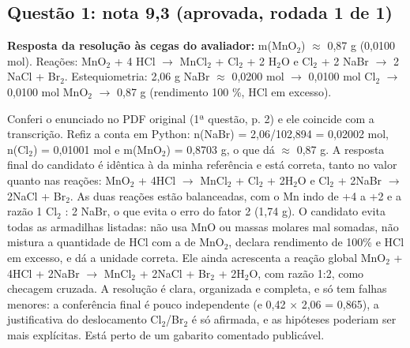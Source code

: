 \documentclass{article}%
\begin{document}
\subsection*{Questão 1: nota 9,3 (aprovada, rodada 1 de 1)}%
\textbf{Resposta da resolução às cegas do avaliador:} m(MnO$_{2}$) $\approx$ 0,87 g (0,0100 mol). Reações: MnO$_{2}$ + 4 HCl $\to$ MnCl$_{2}$ + Cl$_{2}$ + 2 H$_{2}$O e Cl$_{2}$ + 2 NaBr $\to$ 2 NaCl + Br$_{2}$. Estequiometria: 2,06 g NaBr $\approx$ 0,0200 mol $\to$ 0,0100 mol Cl$_{2}$ $\to$ 0,0100 mol MnO$_{2}$ $\to$ 0,87 g (rendimento 100 \%, HCl em excesso).\par %
Conferi o enunciado no PDF original (1ª questão, p. 2) e ele coincide com a transcrição. Refiz a conta em Python: n(NaBr) = 2,06/102,894 = 0,02002 mol, n(Cl$_{2}$) = 0,01001 mol e m(MnO$_{2}$) = 0,8703 g, o que dá $\approx$ 0,87 g. A resposta final do candidato é idêntica à da minha referência e está correta, tanto no valor quanto nas reações: MnO$_{2}$ + 4HCl $\to$ MnCl$_{2}$ + Cl$_{2}$ + 2H$_{2}$O e Cl$_{2}$ + 2NaBr $\to$ 2NaCl + Br$_{2}$. As duas reações estão balanceadas, com o Mn indo de +4 a +2 e a razão 1 Cl$_{2}$ : 2 NaBr, o que evita o erro do fator 2 (1,74 g). O candidato evita todas as armadilhas listadas: não usa MnO ou massas molares mal somadas, não mistura a quantidade de HCl com a de MnO$_{2}$, declara rendimento de 100\% e HCl em excesso, e dá a unidade correta. Ele ainda acrescenta a reação global MnO$_{2}$ + 4HCl + 2NaBr $\to$ MnCl$_{2}$ + 2NaCl + Br$_{2}$ + 2H$_{2}$O, com razão 1:2, como checagem cruzada. A resolução é clara, organizada e completa, e só tem falhas menores: a conferência final é pouco independente (e 0,42 $\times$ 2,06 = 0,865), a justificativa do deslocamento Cl$_{2}$/Br$_{2}$ é só afirmada, e as hipóteses poderiam ser mais explícitas. Está perto de um gabarito comentado publicável.%
\end{document}
